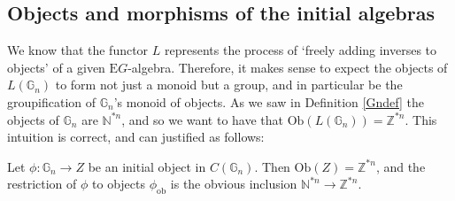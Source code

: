 \documentclass{amsart} %
\begin{document}
\subsection{Objects and morphisms of the initial algebras}

We know that the functor $L$ represents the process of `freely adding inverses to objects' of a given $\mathrm{E}G$-algebra. Therefore, it makes sense to expect the objects of $L(\mathbb{G}_n)$ to form not just a monoid but a group, and in particular be the groupification of $\mathbb{G}_n$'s monoid of objects. As we saw in Definition \ref{Gndef} the objects of $\mathbb{G}_n$ are $\mathbb{N}^{*n}$, and so we want to have that $\mathrm{Ob}(L(\mathbb{G}_n)) = \mathbb{Z}^{*n}$. This intuition is correct, and can justified as follows:

\begin{prop}\label{Zobj} Let $\phi: \mathbb{G}_n \to Z$ be an initial object in $C(\mathbb{G}_n)$. Then $\mathrm{Ob}(Z) = \mathbb{Z}^{*n}$, and the restriction of $\phi$ to objects $\phi_{\mathrm{ob}}$ is the obvious inclusion $\mathbb{N}^{*n} \to \mathbb{Z}^{*n}$.
\end{prop}
\end{document}
